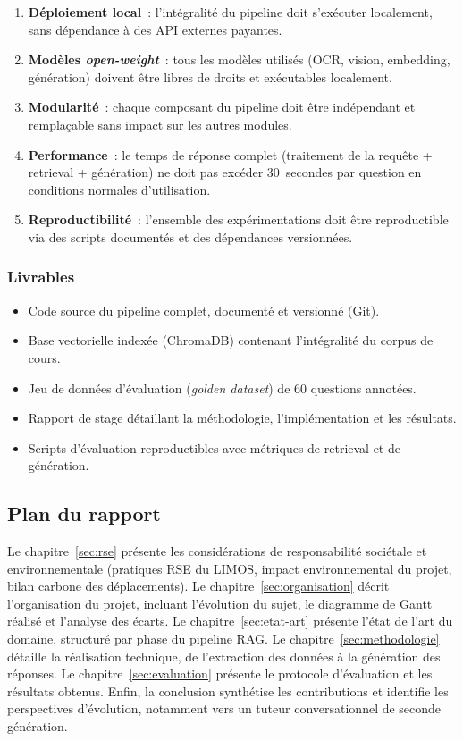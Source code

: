 \documentclass[11pt,a4paper]{article}
\begin{document}
\begin{enumerate}
  \item \textbf{Déploiement local}~: l'intégralité du pipeline doit s'exécuter localement, sans dépendance à des API externes payantes.
  \item \textbf{Modèles \textit{open-weight}}~: tous les modèles utilisés (OCR, vision, embedding, génération) doivent être libres de droits et exécutables localement.
  \item \textbf{Modularité}~: chaque composant du pipeline doit être indépendant et remplaçable sans impact sur les autres modules.
  \item \textbf{Performance}~: le temps de réponse complet (traitement de la requête + retrieval + génération) ne doit pas excéder 30~secondes par question en conditions normales d'utilisation.
  \item \textbf{Reproductibilité}~: l'ensemble des expérimentations doit être reproductible via des scripts documentés et des dépendances versionnées.
\end{enumerate}

\subsubsection{Livrables}

\begin{itemize}
  \item Code source du pipeline complet, documenté et versionné (Git).
  \item Base vectorielle indexée (ChromaDB) contenant l'intégralité du corpus de cours.
  \item Jeu de données d'évaluation (\textit{golden dataset}) de 60 questions annotées.
  \item Rapport de stage détaillant la méthodologie, l'implémentation et les résultats.
  \item Scripts d'évaluation reproductibles avec métriques de retrieval et de génération.
\end{itemize}

\subsection{Plan du rapport}

Le chapitre~\ref{sec:rse} présente les considérations de responsabilité sociétale et environnementale (pratiques RSE du LIMOS, impact environnemental du projet, bilan carbone des déplacements). Le chapitre~\ref{sec:organisation} décrit l'organisation du projet, incluant l'évolution du sujet, le diagramme de Gantt réalisé et l'analyse des écarts. Le chapitre~\ref{sec:etat-art} présente l'état de l'art du domaine, structuré par phase du pipeline RAG. Le chapitre~\ref{sec:methodologie} détaille la réalisation technique, de l'extraction des données à la génération des réponses. Le chapitre~\ref{sec:evaluation} présente le protocole d'évaluation et les résultats obtenus. Enfin, la conclusion synthétise les contributions et identifie les perspectives d'évolution, notamment vers un tuteur conversationnel de seconde génération.
\end{document}
